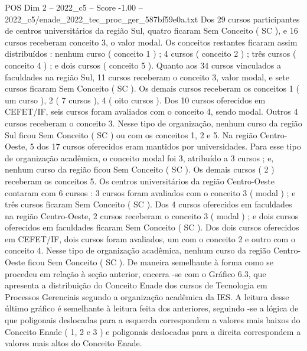 \begin{textsample}{POS Dim 2 – 2022\_c5 – Score -1.00 – 2022\_c5/enade\_2022\_tec\_proc\_ger\_587bf59e0a.txt}
Dos 29 cursos participantes de centros universitários da região Sul, quatro ficaram Sem Conceito ( SC ), e 16 cursos receberam conceito 3, o valor modal.
Os conceitos restantes ficaram assim distribuídos : nenhum curso ( conceito 1 ) ; 4 cursos ( conceito 2 ) ; três cursos ( conceito 4 ) ; e dois cursos ( conceito 5 ).
Quanto aos 34 cursos vinculados a faculdades na região Sul, 11 cursos receberam o conceito 3, valor modal, e sete cursos ficaram Sem Conceito ( SC ).
Os demais cursos receberam os conceitos 1 ( um curso ), 2 ( 7 cursos ), 4 ( oito cursos ).
Dos 10 cursos oferecidos em CEFET/IF, seis cursos foram avaliados com o conceito 4, sendo modal.
Outros 4 cursos receberam o conceito 3.
Nesse tipo de organização, nenhum curso da região Sul ficou Sem Conceito ( SC ) ou com os conceitos 1, 2 e 5.
Na região Centro-Oeste, 5 dos 17 cursos oferecidos eram mantidos por universidades.
Para esse tipo de organização acadêmica, o conceito modal foi 3, atribuído a 3 cursos ; e, nenhum curso da região ficou Sem Conceito ( SC ).
Os demais cursos ( 2 ) receberam os conceitos 5.
Os centros universitários da região Centro-Oeste contaram com 6 cursos : 3 cursos foram avaliados com o conceito 3 ( modal ) ; e três cursos ficaram Sem Conceito ( SC ).
Dos 4 cursos oferecidos em faculdades na região Centro-Oeste, 2 cursos receberam o conceito 3 ( modal ) ; e dois cursos oferecidos em faculdades ficaram Sem Conceito ( SC ).
Dos dois cursos oferecidos em CEFET/IF, dois cursos foram avaliados, um com o conceito 2 e outro com o conceito 4.
Nesse tipo de organização acadêmica, nenhum curso da região Centro-Oeste ficou Sem Conceito ( SC ).
De maneira semelhante à forma como se procedeu em relação à seção anterior, encerra -se com o Gráfico 6.3, que apresenta a distribuição do Conceito Enade dos cursos de Tecnologia em Processos Gerenciais segundo a organização acadêmica da IES.
A leitura desse último gráfico é semelhante à leitura feita dos anteriores, seguindo -se a lógica de que poligonais deslocadas para a esquerda correspondem a valores mais baixos do Conceito Enade ( 1, 2 e 3 ) e poligonais deslocadas para a direita correspondem a valores mais altos do Conceito Enade.

\end{textsample}
